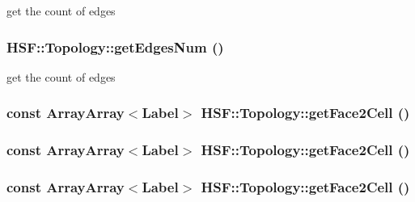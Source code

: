 get the count of edges \hypertarget{classHSF_1_1Topology_aacb3bbf08010f13016ac3db329f18bb8}{
\subsubsection[{getEdgesNum}]{ HSF::Topology::getEdgesNum ()}}
\label{classHSF_1_1Topology_aacb3bbf08010f13016ac3db329f18bb8}


get the count of edges \hypertarget{classHSF_1_1Topology_a6265b70c435a5e60b8389dedbe880228}{
\subsubsection[{getFace2Cell}]{\setlength{\rightskip}{0pt plus 5cm}const {\bf ArrayArray}$<${\bf Label}$>$ HSF::Topology::getFace2Cell ()}}
\label{classHSF_1_1Topology_a6265b70c435a5e60b8389dedbe880228}
\hypertarget{classHSF_1_1Topology_a6265b70c435a5e60b8389dedbe880228}{
\subsubsection[{getFace2Cell}]{\setlength{\rightskip}{0pt plus 5cm}const {\bf ArrayArray}$<${\bf Label}$>$ HSF::Topology::getFace2Cell ()}}
\label{classHSF_1_1Topology_a6265b70c435a5e60b8389dedbe880228}
\hypertarget{classHSF_1_1Topology_a6265b70c435a5e60b8389dedbe880228}{
\subsubsection[{getFace2Cell}]{\setlength{\rightskip}{0pt plus 5cm}const {\bf ArrayArray}$<${\bf Label}$>$ HSF::Topology::getFace2Cell ()}}
